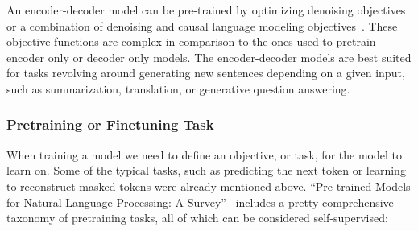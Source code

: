 \documentclass{article}
\begin{document}
An encoder-decoder model can be pre-trained by optimizing denoising objectives~ or a combination of denoising and causal language modeling objectives~. These objective functions are complex in comparison to the ones used to pretrain encoder only or decoder only models. 
The encoder-decoder models are best suited for tasks revolving around generating new sentences depending on a given input, such as summarization, translation, or generative question answering.

\subsubsection{Pretraining  or Finetuning Task}

When training a model we need to define an objective, or task, for the model to learn on. Some of the typical tasks, such as predicting the next token or learning to reconstruct masked tokens were already mentioned above. “Pre-trained Models for Natural Language Processing: A Survey”~ includes a pretty comprehensive taxonomy of pretraining tasks, all of which can be considered self-supervised:
\end{document}
